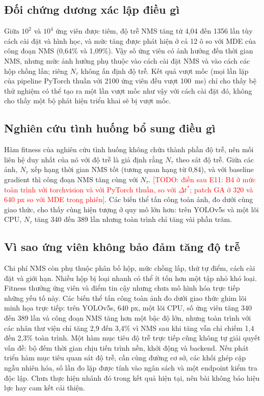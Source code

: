 \documentclass[a4paper,fleqn]{cas-dc}
\newcommand{\todo}[1]{\textcolor{red}{[TODO: #1]}}
\newcommand{\Ntau}{N_{\tau}}
\begin{document}
\subsection{Đối chứng dương xác lập điều gì}
Giữa $10^2$ và $10^4$ ứng viên được tiêm, độ trễ NMS tăng từ 4,04 đến 1356 lần tùy cách cài đặt và hình học, và mức tăng được phát hiện ở cả 12 ô so với MDE của công đoạn NMS (0,64\% và 1,09\%). Vậy số ứng viên có ảnh hưởng đến thời gian NMS, nhưng mức ảnh hưởng phụ thuộc vào cách cài đặt NMS và vào cách các hộp chồng lấn; riêng $\Ntau$ không ấn định độ trễ. Kết quả vượt mốc (mọi lần lặp của pipeline PyTorch thuần với 2100 ứng viên đều vượt 100~ms) chỉ cho thấy bệ thử nghiệm có thể tạo ra một lần vượt mốc như vậy với cách cài đặt đó, không cho thấy một bộ phát hiện triển khai sẽ bị vượt mốc.

\subsection{Nghiên cứu tình huống bổ sung điều gì}
Hàm fitness của nghiên cứu tình huống không chứa thành phần độ trễ, nên mối liên hệ duy nhất của nó với độ trễ là giả định rằng $\Ntau$ theo sát độ trễ. Giữa các ảnh, $\Ntau$ xếp hạng thời gian NMS tốt (tương quan hạng từ 0,84), và với baseline gradient thì công đoạn NMS tăng cùng với $\Ntau$. \todo{điền sau E11: B4 ở mức toàn trình với torchvision và với PyTorch thuần, so với $\Delta t^{*}$; patch GA ở 320 và 640 px so với MDE trong phiên}. Các biến thể tấn công toàn ảnh, đo dưới cùng giao thức, cho thấy cùng hiện tượng ở quy mô lớn hơn: trên YOLOv5s và một lõi CPU, $\Ntau$ tăng 340 đến 389 lần nhưng toàn trình chỉ tăng vài phần trăm.

\subsection{Vì sao ứng viên không bảo đảm tăng độ trễ}
Chi phí NMS còn phụ thuộc phân bố hộp, mức chồng lấp, thứ tự điểm, cách cài đặt và giới hạn. Nhiều hộp bị loại nhanh có thể ít tốn hơn một tập nhỏ khó loại. Fitness thưởng ứng viên và điểm tin cậy nhưng chưa mô hình hóa trực tiếp những yếu tố này. Các biến thể tấn công toàn ảnh đo dưới giao thức ghim lõi minh họa trực tiếp: trên YOLOv5s, 640 px, một lõi CPU, số ứng viên tăng 340 đến 389 lần và công đoạn NMS tăng hơn một bậc độ lớn, nhưng toàn trình với các nhân thư viện chỉ tăng 2,9 đến 3,4\% vì NMS sau khi tăng vẫn chỉ chiếm 1,4 đến 2,3\% toàn trình. Một hàm mục tiêu độ trễ trực tiếp cũng không tự giải quyết vấn đề: bộ đếm thời gian chịu tiến trình nền, khởi động và backend. Nếu phát triển hàm mục tiêu quan sát độ trễ, cần cùng đường cơ sở, các khối ghép cặp ngẫu nhiên hóa, số lần đo lặp được tính vào ngân sách và một endpoint kiểm tra độc lập. Chưa thực hiện nhánh đó trong kết quả hiện tại, nên bài không báo hiệu lực hay cam kết cải thiện.
\end{document}
